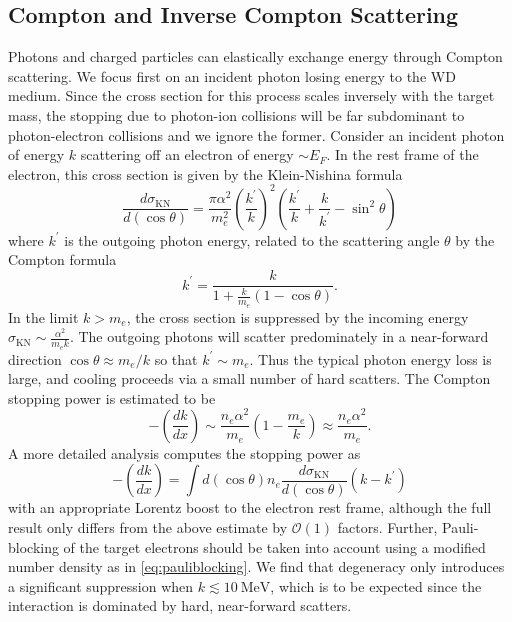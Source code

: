 \documentclass[twocolumn,showpacs,preprintnumbers,amsmath,amssymb,prd]{revtex4}
\newcommand{\OO}{\mathcal{O}}
\def\r{\right)}
\def\l{\left(}
\begin{document}
\begin{appendices}
\subsection*{Compton and Inverse Compton Scattering}
Photons and charged particles can elastically exchange energy through Compton scattering.
We focus first on an incident photon losing energy to the WD medium.
Since the cross section for this process scales inversely with the target mass, the stopping due to photon-ion collisions will be far subdominant to photon-electron collisions and we ignore the former. 
Consider an incident photon of energy $k$ scattering off an electron of energy $\sim E_F$.
In the rest frame of the electron, this cross section is given by the Klein-Nishina formula
\begin{equation}
\label{KN}
  \frac{d\sigma_\text{KN}}{d (\cos \theta)} = \frac{\pi \alpha^2}{m_e^2} 
  \l \frac{k^\prime}{k} \r^2 
  \l \frac{k^\prime}{k} + \frac{k}{k^\prime} -\sin^2 \theta \r
\end{equation}
where $k^\prime$ is the outgoing photon energy, related to the scattering angle $\theta$ by the Compton formula
\begin{equation}
{k^{\prime }={\frac {k}{1+{\frac {k}{m_e}}(1-\cos \theta )}}}.
\end{equation}
In the limit $k > m_e$, the cross section is suppressed by the incoming energy $\sigma_\text{KN} \sim \frac{\alpha^2}{m_e k}$. 
The outgoing photons will scatter predominately in a near-forward direction $\cos \theta \approx m_e/k$ so that $k^\prime \sim m_e$.
Thus the typical photon energy loss is large, and cooling proceeds via a small number of hard scatters.
The Compton stopping power is estimated to be
\begin{equation}
\label{eq:approx-comptonSP}
  - \l\frac{dk}{dx}\r \sim \frac{n_e \alpha^2}{m_e} \l 1 - \frac{m_e}{k} \r \approx \frac{n_e \alpha^2}{m_e}.
\end{equation}
A more detailed analysis computes the stopping power as 
\begin{equation}
\label{eq:comptonSP}
  -\l\frac{dk}{dx}\r =  \int d (\cos \theta) n_e \frac{d\sigma_\text{KN}}{d (\cos \theta)} \l k - k^\prime \r
\end{equation}
with an appropriate Lorentz boost to the electron rest frame, although the full result only differs from the above estimate by $\OO(1)$ factors.
Further, Pauli-blocking of the target electrons should be taken into account using a modified number density as in \eqref{eq:pauliblocking}.
We find that degeneracy only introduces a significant suppression when $k \lesssim 10 ~\text{MeV}$, which is to be expected since the interaction is dominated by hard, near-forward scatters.


\end{appendices}
\end{document}
